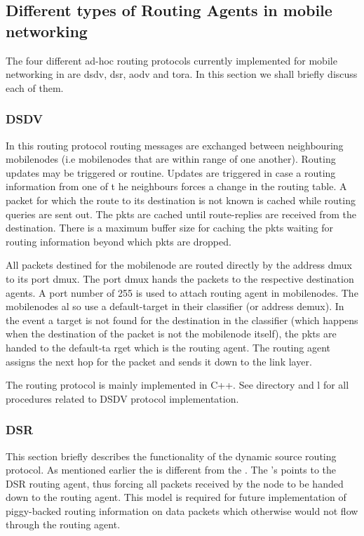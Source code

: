 \subsection{Different types of Routing Agents in mobile networking}
\label{sec:mobilenode-routing}

The four different ad-hoc routing protocols currently implemented
for mobile networking in \ns are dsdv, dsr, aodv and tora. In this section
we shall briefly discuss each of them.

\subsubsection{DSDV}
\label{sec:dsdv}

In this routing protocol routing messages are exchanged between
neighbouring mobilenodes (i.e mobilenodes that are within range of one
another). Routing updates may be triggered or routine. Updates are
triggered in case a routing information from one of t   
he neighbours forces a change in the routing table.
A packet for which the route to its destination is not known is cached
while routing queries are sent out. The pkts are cached until
route-replies are received from the destination. There is a maximum buffer
size for caching the pkts waiting for routing information beyond which
pkts are dropped. 

All packets destined for the mobilenode are routed directly by the address
dmux to its port dmux. The port dmux hands the packets to the respective
destination agents. A port number of 255 is used to attach routing agent
in mobilenodes. The mobilenodes al
so use a default-target in their classifier (or address demux). In the
event a target is not found for the destination in the classifier (which
happens when the destination of the packet is not the mobilenode itself),
the pkts are handed to the default-ta   
rget which is the routing agent. The routing agent assigns the next hop
for the packet and sends it down to the link layer. 

The routing protocol is mainly implemented in C++. See 
directory and l for all procedures related to
DSDV protocol implementation.  

\subsubsection{DSR}
\label{sec:dsr}

This section briefly describes the functionality of the dynamic source
routing protocol. As mentioned earlier the  is different from
the .  The 's  points to the
DSR routing agent, thus forcing all    
packets received by the node to be handed down to the routing agent. This
model is required for future implementation of piggy-backed routing
information on data packets which otherwise would not flow through the
routing agent.   

